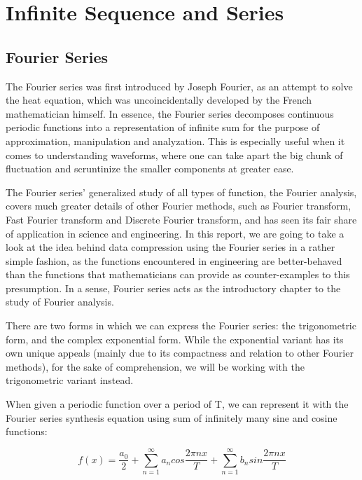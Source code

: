 \documentclass[a4paper]{article}
\begin{document}
\newpage
{}
\section{Infinite Sequence and Series}
\subsection{Fourier Series}
The Fourier series was first introduced by Joseph Fourier, as an attempt to solve the heat equation, which was uncoincidentally developed by the French mathematician himself. In essence, the Fourier series decomposes continuous periodic functions into a representation of infinite sum for the purpose of approximation, manipulation and analyzation. This is especially useful when it comes to understanding waveforms, where one can take apart the big chunk of fluctuation and scruntinize the smaller components at greater ease.

The Fourier series' generalized study of all types of function, the Fourier analysis, covers much greater details of other Fourier methods, such as Fourier transform, Fast Fourier transform and Discrete Fourier transform, and has seen its fair share of application in science and engineering. In this report, we are going to take a look at the idea behind data compression using the Fourier series in a rather simple fashion, as the functions encountered in engineering are better-behaved than the functions that mathematicians can provide as counter-examples to this presumption. In a sense, Fourier series acts as the introductory chapter to the study of Fourier analysis.

There are two forms in which we can express the Fourier series: the trigonometric form, and the complex exponential form. While the exponential variant has its own unique appeals (mainly due to its compactness and relation to other Fourier methods), for the sake of comprehension, we will be working with the trigonometric variant instead.

When given a periodic function over a period of T, we can represent it with the Fourier series synthesis equation using sum of infinitely many sine and cosine functions:

\begin{equation*}
	f(x) = \frac{a_0}{2} + \sum\limits_{n=1}^\infty a_n cos\frac{2\pi n x}{T} + \sum\limits_{n=1}^\infty b_n sin\frac{2\pi n x}{T}
\end{equation*}
\end{document}
